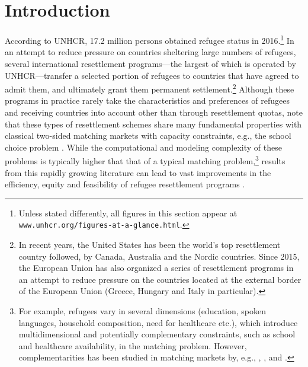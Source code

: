 \documentclass[12pt,fleqn]{article}
\begin{document}
\section{Introduction}
According to UNHCR, 17.2 million persons obtained refugee status in 2016.\footnote{Unless stated differently, all figures in this section appear at \texttt{www.unhcr.org/figures-at-a-glance.html}.} In an attempt to reduce pressure on countries sheltering large numbers of refugees, several international resettlement programs---the largest of which is operated by UNHCR---transfer a selected portion of refugees to countries that have agreed to admit them, and ultimately grant them permanent settlement.\footnote{In recent years, the United States has been the world's top resettlement country followed, by Canada, Australia and the Nordic countries. Since 2015, the European Union has also organized a series of resettlement programs in an attempt to reduce pressure on the countries located at the external border of the European Union (Greece, Hungary and Italy in particular).} Although these programs in practice rarely take the characteristics and preferences of refugees and receiving countries into account other than through resettlement quotas, \citet{bib:JonesTeytelboym2016b,bib:JonesTeytelboym2016a} note that these types of resettlement schemes share many fundamental properties with classical two-sided matching markets with capacity constraints, e.g., the school choice problem \citep{bib:AbdulkadirougluSonmez}. While the computational and modeling complexity of these problems is typically higher that that of a typical matching problem,\footnote{For example, refugees vary in several dimensions (education, spoken languages, household composition, need for healthcare etc.), which introduce multidimensional and potentially complementary constraints, such as school and healthcare availability, in the matching problem. However, complementarities has been studied in matching markets by, e.g., \citet{bib:HatfieldKominers}, \citet{bib:PathakRoth}, \citet{bib:Pycia} and \citet{bib:RothPeranson}.} results from this rapidly growing literature can lead to vast improvements in the efficiency, equity and feasibility of refugee resettlement programs \citep{bib:Andersson,bib:BansakEtAl,bib:DelacretazEtAl2016,bib:JonesTeytelboym2016a}.
\end{document}
